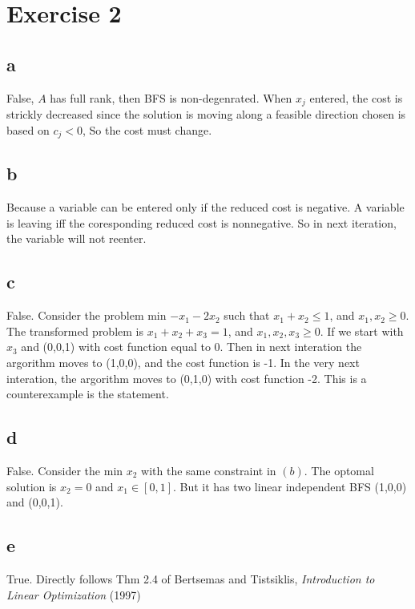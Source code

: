 \documentclass[12pt,a4paper]{article}
\begin{document}
\section*{Exercise 2}
\subsection*{a}
False, $A$ has full rank, then BFS is non-degenrated. When $x_j$ entered, the cost is strickly decreased since the solution is moving along a feasible direction chosen is based on $c_j<0$, So the cost must change.
\subsection*{b}
Because a variable can be entered only if the reduced cost is negative. A variable is leaving iff the coresponding reduced cost is nonnegative. So in next iteration, the variable will not reenter.
\subsection*{c}
 False. Consider the problem min $-x_1 - 2x_2$ such that $x_1 + x_2 \le 1$, and $x_1, x_2 \ge 0$. The transformed problem is $x_1 + x_2 +x_3= 1$, and $x_1, x_2 , x_3\ge 0$. If we start with $x_3$ and (0,0,1) with cost function equal to 0. Then in next interation the argorithm moves to (1,0,0), and the cost function is -1. In the very next interation, the argorithm moves to (0,1,0) with cost function -2. This is a counterexample is the statement.
 
\subsection*{d}
 False. Consider the min $x_2$ with the same constraint in $(b)$. The optomal solution is $x_2=0$ and $x_1\in [0,1]$. But it has two linear independent BFS (1,0,0) and (0,0,1).
 
\subsection*{e}
 True. Directly follows Thm 2.4 of Bertsemas and Tistsiklis,
\emph{ Introduction to Linear Optimization} (1997)
\end{document}
